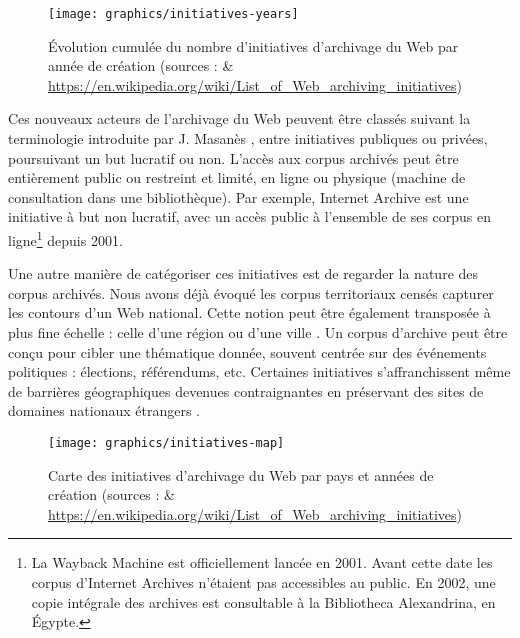 \documentclass[symmetric,justified,marginals=raggedouter]{tufte-book}
\begin{document}
\begin{figure}%
  \texttt{[image: graphics/initiatives-years]}
  \caption{Évolution cumulée du nombre d'initiatives d'archivage du Web par année de création (sources : \citep{gomes_survey_2011} \& \url{https://en.wikipedia.org/wiki/List_of_Web_archiving_initiatives})}
  \label{fig:date-initiative}
\end{figure} 

\noindent Ces nouveaux acteurs de l'archivage du Web peuvent être classés suivant la terminologie introduite par J. Masanès \citep[p.76]{masanes_web_2006}, entre initiatives publiques ou privées, poursuivant un but lucratif ou non. L'accès aux corpus archivés peut être entièrement public ou restreint et limité, en ligne ou physique (machine de consultation dans une bibliothèque). Par exemple, Internet Archive est une initiative à but non lucratif, avec un accès public à l'ensemble de ses corpus en ligne\footnote{\RaggedOuter La Wayback Machine est officiellement lancée en 2001. Avant cette date les corpus d'Internet Archives n'étaient pas accessibles au public. En 2002, une copie intégrale des archives est consultable à la Bibliotheca Alexandrina, en Égypte.} depuis 2001. 

Une autre manière de catégoriser ces initiatives est de regarder la nature des corpus archivés. Nous avons déjà évoqué les corpus territoriaux censés capturer les contours d'un Web national. Cette notion peut être également transposée à plus fine échelle : celle d'une région ou d'une ville \citep{boudrez_archiving_2002}. Un corpus d'archive peut être conçu pour cibler une thématique donnée, souvent  centrée sur des événements politiques \citep{voerman_archiving_2002,schneider_building_2003} : élections, référendums, etc. Certaines initiatives s'affranchissent même de barrières géographiques devenues contraignantes en préservant des sites de domaines nationaux étrangers \citep{gomes_introducing_2009}.

\begin{figure*}%
  \texttt{[image: graphics/initiatives-map]}
  \caption{Carte des initiatives d'archivage du Web par pays et années de création (sources : \citep{gomes_survey_2011} \& \url{https://en.wikipedia.org/wiki/List_of_Web_archiving_initiatives})}
  \label{fig:map-initiative}
\end{figure*} 
\end{document}
